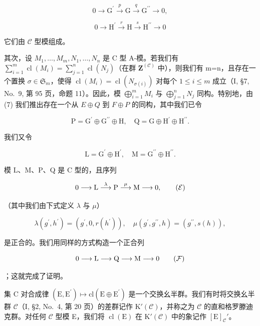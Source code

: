 \[
0 \longrightarrow \mathrm{G} ^ {\prime} \stackrel {p} {\longrightarrow} \mathrm{G} \stackrel {q} {\longrightarrow} \mathrm{G} ^ {\prime \prime} \longrightarrow 0,\tag{H}
\]

\[
0 \longrightarrow \mathrm{H} ^ {\prime} \stackrel {r} {\longrightarrow} \mathrm{H} \stackrel {s} {\longrightarrow} \mathrm{H} ^ {\prime \prime} \longrightarrow 0
\]

它们由 \(\mathcal{C}\) 型模组成。

其次，设 \(M_{1},\ldots,M_{m},N_{1},\ldots,N_{n}\) 是 C 型 A-模。若我们有 \(\sum_{i=1}^{m}\operatorname{cl}(M_{i})=\sum_{j=1}^{n}\operatorname{cl}(N_{j})\)（在群 \(\mathbf{Z}^{(\mathcal{C})}\) 中），则我们有 m=n，且存在一个置换 \(\sigma\in\mathfrak{S}_{m}\)，使得 \(\operatorname{cl}(M_{i})=\operatorname{cl}(N_{\sigma(i)})\) 对每个 \(1\leqslant i\leqslant m\) 成立（I, §7, No.~9, 第 95 页，命题 11）。因此，模 \(\bigoplus_{i=1}^{m}M_{i}\) 与 \(\bigoplus_{j=1}^{n}N_{j}\) 同构。特别地，由 (7) 我们推出存在一个从 \(E\oplus Q\) 到 \(F\oplus P\) 的同构，其中我们已令

\[
\mathrm{P} = \mathrm{G} ^ {\prime} \oplus \mathrm{G} ^ {\prime \prime} \oplus \mathrm{H}, \quad \mathrm{Q} = \mathrm{G} \oplus \mathrm{H} ^ {\prime} \oplus \mathrm{H} ^ {\prime \prime}.
\]

我们又令

\[
\mathrm{L} = \mathrm{G} ^ {\prime} \oplus \mathrm{H} ^ {\prime}, \quad \mathrm{M} = \mathrm{G} ^ {\prime \prime} \oplus \mathrm{H} ^ {\prime \prime}.
\]

模 L、M、P、Q 是 C 型的，且序列

\[
0 \longrightarrow \mathrm{L} \stackrel {\lambda} {\longrightarrow} \mathrm{P} \stackrel {\mu} {\longrightarrow} \mathrm{M} \longrightarrow 0,\tag{\( \mathcal{E} \)}
\]

（其中我们由下式定义 \(\lambda\) 与 \(\mu\)）

\[
\lambda (g ^ {\prime}, h ^ {\prime}) = \left(g ^ {\prime}, 0, r (h ^ {\prime})\right), \quad \mu (g ^ {\prime}, g ^ {\prime \prime}, h) = \left(g ^ {\prime \prime}, s (h)\right),
\]

是正合的。我们用同样的方式构造一个正合列

\[
0 \longrightarrow \mathrm{L} \longrightarrow \mathrm{Q} \longrightarrow \mathrm{M} \longrightarrow 0\tag{\( \mathcal{F} \)}
\]

；这就完成了证明。

集 C 对合成律 \((\mathrm{E}, \mathrm{E}^{\prime}) \mapsto \mathrm{cl}(\mathrm{E} \oplus \mathrm{E}^{\prime})\) 是一个交换幺半群。我们有时将交换幺半群 \(\mathcal{C}\)（I, §2, No.~4, 第 20 页）的差群记作 \(\mathrm{K}'(\mathcal{C})\)，并称之为 \(\mathcal{C}\) 的直和格罗滕迪克群。对任何 \(\mathcal{C}\) 型模 E，我们将 \(\operatorname{cl}(\mathrm{E})\) 在 \(\mathrm{K}'(\mathcal{C})\) 中的象记作 \([\mathrm{E}]_{\mathcal{C}}'\)。


